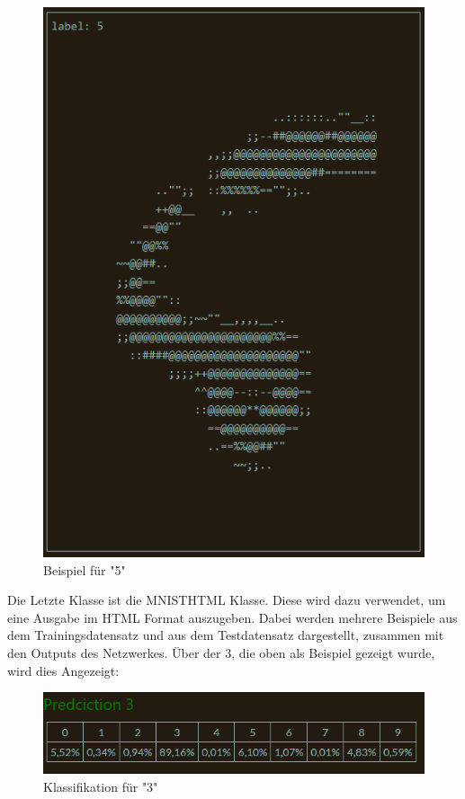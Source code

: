 \documentclass[12pt]{article}
\begin{document}
\begin{figure}[H]
\centering
\includegraphics[scale=0.60]{./Images/Pasted image 20231001133317.png}
\caption{Beispiel für "5"}
\label{Was kommt hier rein?}
\end{figure}
Die Letzte Klasse ist die MNISTHTML Klasse. Diese wird dazu verwendet, um eine Ausgabe im HTML Format auszugeben. Dabei werden mehrere Beispiele aus dem Trainingsdatensatz und aus dem Testdatensatz dargestellt, zusammen mit den Outputs des Netzwerkes.
Über der 3, die oben als Beispiel gezeigt wurde, wird dies Angezeigt:\begin{figure}[H]
\centering
\includegraphics[scale=0.60]{./Images/Pasted image 20231001133707.png}
\caption{Klassifikation für "3"}
\label{Was kommt hier rein?}
\end{figure}
\end{document}
